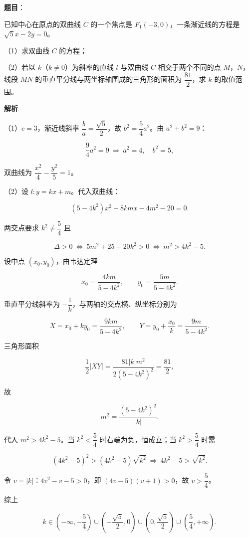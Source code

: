 \begin{answer}

\textbf{题目}：

已知中心在原点的双曲线 $C$ 的一个焦点是 $F_1(-3,0)$，一条渐近线的方程是 $\sqrt5x-2y=0$。

（1）求双曲线 $C$ 的方程；

（2）若以 $k$（$k\neq0$）为斜率的直线 $l$ 与双曲线 $C$ 相交于两个不同的点 $M$，$N$，线段 $MN$ 的垂直平分线与两坐标轴围成的三角形的面积为 $\dfrac{81}2$，求 $k$ 的取值范围。

\textbf{解析}

（1）$c=3$，渐近线斜率 $\dfrac ba=\dfrac{\sqrt5}2$，故 $b^2=\dfrac54a^2$。由 $a^2+b^2=9$：

\nopagebreak[4]
\[\frac94a^2=9\ \Longrightarrow\ a^2=4,\quad b^2=5,\]

双曲线为 $\dfrac{x^2}4-\dfrac{y^2}5=1$。

（2）设 $l:y=kx+m$。代入双曲线：

\nopagebreak[4]
\[(5-4k^2)x^2-8kmx-4m^2-20=0.\]

两交点要求 $k^2\neq\dfrac54$ 且

\nopagebreak[4]
\[\Delta>0\ \Longleftrightarrow\ 5m^2+25-20k^2>0\ \Longleftrightarrow\ m^2>4k^2-5.\]

设中点 $(x_0,y_0)$，由韦达定理

\nopagebreak[4]
\[x_0=\frac{4km}{5-4k^2},\qquad y_0=\frac{5m}{5-4k^2}.\]

垂直平分线斜率为 $-\dfrac1k$，与两轴的交点横、纵坐标分别为

\nopagebreak[4]
\[X=x_0+ky_0=\frac{9km}{5-4k^2},\qquad Y=y_0+\frac{x_0}k=\frac{9m}{5-4k^2}.\]

三角形面积

\nopagebreak[4]
\[\frac12|XY|=\frac{81|k|m^2}{2(5-4k^2)^2}=\frac{81}2,\]

故

\nopagebreak[4]
\[m^2=\frac{(5-4k^2)^2}{|k|}.\]

代入 $m^2>4k^2-5$。当 $k^2<\dfrac54$ 时右端为负，恒成立；当 $k^2>\dfrac54$ 时需

\nopagebreak[4]
\[(4k^2-5)^2>(4k^2-5)\sqrt{k^2}\ \Longrightarrow\ 4k^2-5>\sqrt{k^2}.\]

令 $v=|k|$：$4v^2-v-5>0$，即 $(4v-5)(v+1)>0$，故 $v>\dfrac54$。

综上

\nopagebreak[4]
\[k\in\left(-\infty,-\frac54\right)\cup\left(-\frac{\sqrt5}2,0\right)\cup\left(0,\frac{\sqrt5}2\right)\cup\left(\frac54,+\infty\right).\]


\end{answer}